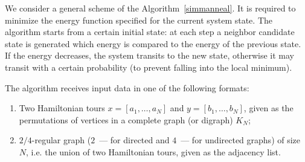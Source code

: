\documentclass[runningheads]{llncs}
\begin{document}
We consider a general scheme of the Algorithm~\ref{simmanneal}.
It is required to minimize the energy function specified for the current system state. The algorithm starts from a certain initial state: at each step a neighbor candidate state is generated which energy is compared to the energy of the previous state. If the energy decreases, the system transits to the new state, otherwise it may transit with a certain probability (to prevent falling into the local minimum). %

The algorithm receives input data in one of the following formats: %
\begin{enumerate}
    \item Two Hamiltonian tours $x = [a_1, \ldots, a_N]$ and $y = [b_1, \ldots, b_N]$, given as the permutations of vertices in a complete graph (or digraph) $K_N$; %
    \item $2/4$-regular graph ($2$~--- for directed and $4$~--- for undirected graphs) of size $N$, i.e. the union of two Hamiltonian tours, given as the adjacency list. %
\end{enumerate}
\end{document}
